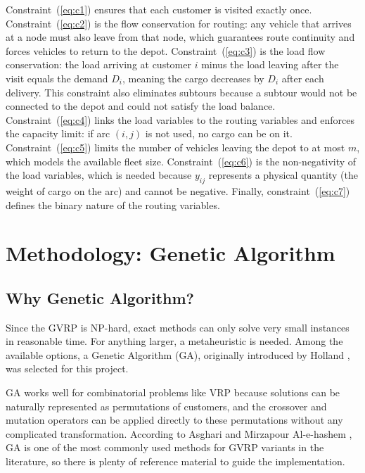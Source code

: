 \documentclass [a4paper, 11pt, titlepage] {article}
\begin{document}
Constraint~(\ref{eq:c1}) ensures that each customer is visited exactly once. Constraint~(\ref{eq:c2}) is the flow conservation for routing: any vehicle that arrives at a node must also leave from that node, which guarantees route continuity and forces vehicles to return to the depot. Constraint~(\ref{eq:c3}) is the load flow conservation: the load arriving at customer $i$ minus the load leaving after the visit equals the demand $D_i$, meaning the cargo decreases by $D_i$ after each delivery. This constraint also eliminates subtours because a subtour would not be connected to the depot and could not satisfy the load balance. Constraint~(\ref{eq:c4}) links the load variables to the routing variables and enforces the capacity limit: if arc $(i,j)$ is not used, no cargo can be on it. Constraint~(\ref{eq:c5}) limits the number of vehicles leaving the depot to at most $m$, which models the available fleet size. Constraint~(\ref{eq:c6}) is the non-negativity of the load variables, which is needed because $y_{ij}$ represents a physical quantity (the weight of cargo on the arc) and cannot be negative. Finally, constraint~(\ref{eq:c7}) defines the binary nature of the routing variables.

\section{Methodology: Genetic Algorithm}
\label{sec:method}

\subsection{Why Genetic Algorithm?}

Since the GVRP is NP-hard, exact methods can only solve very small instances in reasonable time. For anything larger, a metaheuristic is needed. Among the available options, a Genetic Algorithm (GA), originally introduced by Holland \cite{holland1975}, was selected for this project.

GA works well for combinatorial problems like VRP because solutions can be naturally represented as permutations of customers, and the crossover and mutation operators can be applied directly to these permutations without any complicated transformation. According to Asghari and Mirzapour Al-e-hashem \cite{asghari2021}, GA is one of the most commonly used methods for GVRP variants in the literature, so there is plenty of reference material to guide the implementation.
\end{document}
